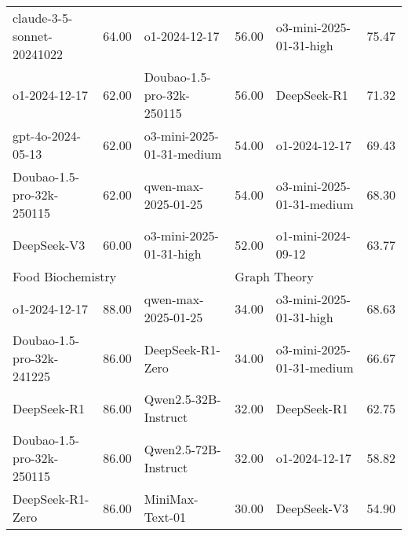 {\begin{longtable}{p{4.2cm}>{\centering\arraybackslash} p{0.8cm}|p{4.2cm} >{\centering\arraybackslash} p{0.8cm}|p{4.2cm} >{\centering\arraybackslash} p{0.8cm}}
\hline
\cellcolor{blue!5} claude-3-5-sonnet-20241022 & \cellcolor{blue!2}64.00 & \cellcolor{orange!5} o1-2024-12-17 & \cellcolor{orange!2} 56.00 & \cellcolor{green!5} o3-mini-2025-01-31-high & \cellcolor{green!2} 75.47\\
\cellcolor{blue!5} o1-2024-12-17 & \cellcolor{blue!2}62.00 & \cellcolor{orange!5} Doubao-1.5-pro-32k-250115 & \cellcolor{orange!2} 56.00 & \cellcolor{green!5} DeepSeek-R1 & \cellcolor{green!2} 71.32\\
\cellcolor{blue!5} gpt-4o-2024-05-13 & \cellcolor{blue!2}62.00 & \cellcolor{orange!5} o3-mini-2025-01-31-medium & \cellcolor{orange!2} 54.00 & \cellcolor{green!5} o1-2024-12-17 & \cellcolor{green!2} 69.43\\
\cellcolor{blue!5} Doubao-1.5-pro-32k-250115 & \cellcolor{blue!2}62.00 & \cellcolor{orange!5} qwen-max-2025-01-25 & \cellcolor{orange!2} 54.00 & \cellcolor{green!5} o3-mini-2025-01-31-medium & \cellcolor{green!2} 68.30\\
\cellcolor{blue!5} DeepSeek-V3 & \cellcolor{blue!2}60.00 & \cellcolor{orange!5} o3-mini-2025-01-31-high & \cellcolor{orange!2} 52.00 & \cellcolor{green!5} o1-mini-2024-09-12 & \cellcolor{green!2} 63.77\\
\hline
\multicolumn{2}{p{5.15cm}|}{\cellcolor{blue!10} \centering Food Biochemistry} & \multicolumn{2}{p{5.15cm}|}{\cellcolor{orange!10} \centering Information Management Science} & \multicolumn{2}{p{5.15cm}}{\cellcolor{green!10} \centering Graph Theory}\\
\hline
\cellcolor{blue!5} o1-2024-12-17 & \cellcolor{blue!2}88.00 & \cellcolor{orange!5} qwen-max-2025-01-25 & \cellcolor{orange!2} 34.00 & \cellcolor{green!5} o3-mini-2025-01-31-high & \cellcolor{green!2} 68.63\\
\cellcolor{blue!5} Doubao-1.5-pro-32k-241225 & \cellcolor{blue!2}86.00 & \cellcolor{orange!5} DeepSeek-R1-Zero & \cellcolor{orange!2} 34.00 & \cellcolor{green!5} o3-mini-2025-01-31-medium & \cellcolor{green!2} 66.67\\
\cellcolor{blue!5} DeepSeek-R1 & \cellcolor{blue!2}86.00 & \cellcolor{orange!5} Qwen2.5-32B-Instruct & \cellcolor{orange!2} 32.00 & \cellcolor{green!5} DeepSeek-R1 & \cellcolor{green!2} 62.75\\
\cellcolor{blue!5} Doubao-1.5-pro-32k-250115 & \cellcolor{blue!2}86.00 & \cellcolor{orange!5} Qwen2.5-72B-Instruct & \cellcolor{orange!2} 32.00 & \cellcolor{green!5} o1-2024-12-17 & \cellcolor{green!2} 58.82\\
\cellcolor{blue!5} DeepSeek-R1-Zero & \cellcolor{blue!2}86.00 & \cellcolor{orange!5} MiniMax-Text-01 & \cellcolor{orange!2} 30.00 & \cellcolor{green!5} DeepSeek-V3 & \cellcolor{green!2} 54.90\\

\end{longtable}}
